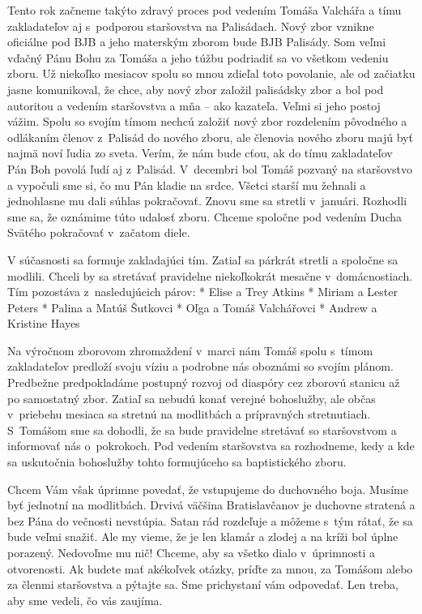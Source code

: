 Tento rok začneme takýto zdravý proces pod vedením Tomáša Valchářa a tímu zakladateľov aj s~podporou staršovstva na Palisádach. Nový zbor vznikne oficiálne pod BJB  a jeho materským zborom bude BJB Palisády. Som veľmi vďačný Pánu Bohu za Tomáša a jeho túžbu podriadiť sa vo všetkom vedeniu zboru. Už niekoľko mesiacov spolu so mnou zdieľal toto povolanie, ale od začiatku jasne komunikoval, že chce, aby nový zbor založil palisádsky zbor a bol pod autoritou a vedením staršovstva a mňa – ako kazateľa. Veľmi si jeho postoj vážim. Spolu so svojím tímom nechcú založiť nový zbor rozdelením pôvodného a odlákaním členov z~Palisád do nového zboru, ale členovia nového zboru majú byť najmä noví ľudia zo sveta. Verím, že nám bude cťou, ak do tímu zakladateľov Pán Boh povolá ľudí aj z~Palisád. V~decembri bol Tomáš pozvaný na staršovstvo a vypočuli sme si, čo mu Pán kladie na srdce. Všetci starší mu žehnali a jednohlasne mu dali súhlas pokračovať. Znovu sme sa stretli v~januári. Rozhodli sme sa, že oznámime túto udalosť zboru. Chceme spoločne pod vedením Ducha Svätého pokračovať v~začatom diele.

V súčasnosti sa formuje zakladajúci tím. Zatiaľ sa párkrát stretli a spoločne sa modlili. Chceli by sa stretávať pravidelne niekoľkokrát mesačne v~domácnostiach. Tím pozostáva z~nasledujúcich párov:
\begitems
* Elise a Trey Atkins
* Miriam a Lester Peters
* Palina a Matúš Šutkovci
* Oľga a Tomáš Valchářovci
* Andrew a Kristine Hayes
\enditems

Na výročnom zborovom zhromaždení v~marci nám Tomáš  spolu s~tímom zakladateľov predloží svoju víziu a podrobne nás oboznámi so svojím plánom. Predbežne predpokladáme postupný rozvoj od diaspóry cez zborovú stanicu až po samostatný zbor. Zatiaľ sa nebudú konať verejné bohoslužby, ale občas v~priebehu mesiaca sa stretnú na modlitbách a prípravných stretnutiach. S~Tomášom sme sa dohodli, že sa bude pravidelne stretávať so staršovstvom a informovať nás o~pokrokoch. Pod vedením staršovstva sa rozhodneme, kedy a kde sa uskutočnia bohoslužby tohto formujúceho sa baptistického zboru.

Chcem Vám však úprimne povedať, že vstupujeme do duchovného boja. Musíme byť jednotní na modlitbách. Drvivá väčšina Bratislavčanov je duchovne stratená a bez Pána do večnosti nevstúpia. Satan rád rozdeľuje a môžeme s~tým rátať, že sa bude veľmi snažiť. Ale my vieme, že je len klamár a zlodej a na kríži bol úplne porazený. Nedovoľme mu nič! Chceme, aby sa všetko dialo v~úprimnosti a otvorenosti. Ak budete mať akékoľvek otázky, príďte za mnou, za Tomášom alebo za členmi staršovstva a pýtajte sa. Sme prichystaní vám odpovedať. Len treba, aby sme vedeli, čo vás zaujíma.

